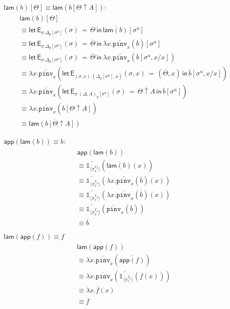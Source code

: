 \documentclass[10pt]{article}
\theoremstyle{definition}
\newcommand{\rewrite}[2]{\overleftarrow{#1}(#2)}
\newcommand\UE[2]{\ensuremath{#1(#2)}}
\newcommand\UI[2]{\ensuremath{\lambda #1.#2}}
\newcommand\EEs[4]{\ensuremath{\mathsf{let} \, \mathsf{E}_{#1}(#3) \, = \, {#2} \, \mathsf{in} \, #4}}
\newcommand\unp[2]{\ensuremath{{#2}^u}}
\newcommand{\modeof}[1]{{#1}_p}
\newcommand{\upstairs}[1]{\overline{#1}}
\newcommand\One{\ensuremath{\mathds{1}}}
\newcommand\ApOne[1]{\ensuremath{\One_{\langle {#1} \rangle }}}
\newcommand\pinv[1]{\ensuremath{\mathtt{pinv}_{#1}}}
\newcommand\qapp[1]{\ensuremath{\mathsf{app}({#1})}}
\newcommand\qlam[1]{\ensuremath{\mathsf{lam}({#1})}}
\begin{document}
\begin{enumerate}[style = multiline, labelwidth = 80pt]
\item[{$\qlam{b}[\Theta] \equiv \qlam{b[\Theta \uparrow A]}$}:]
\begin{align*}
&\upstairs{\qlam{b}[\Theta]} \\
&\equiv \EEs{\sigma.\modeof{\Delta}[\unp{\Delta}{\sigma}]}{\upstairs{\Theta}}{\sigma}{\upstairs{\qlam{b}}[\unp{\Delta}{\sigma}]} \\
&\equiv \EEs{\sigma.\modeof{\Delta}[\unp{\Delta}{\sigma}]}{\upstairs{\Theta}}{\sigma}{\UI{x}{\rewrite{\pinv{x}}{\upstairs{b}}}[\unp{\Delta}{\sigma}]} \\
&\equiv \EEs{\sigma.\modeof{\Delta}[\unp{\Delta}{\sigma}]}{\upstairs{\Theta}}{\sigma}{\UI{x}{\rewrite{\pinv{x}}{\upstairs{b}[\unp{\Delta}{\sigma}, x/x]}}} \\
&\equiv \UI{x}{\rewrite{\pinv{x}}{\EEs{(\sigma, x). (\modeof{\Delta}[\unp{\Delta}{\sigma}], x)}{(\upstairs{\Theta}, x)}{\sigma, x}{\upstairs{b}[\unp{\Delta}{\sigma}, x/x]}}} \\
&\equiv \UI{x}{\rewrite{\pinv{x}}{\EEs{\sigma.\modeof{(\Delta,A)}[\unp{\Delta,A}{\sigma}]}{\upstairs{\Theta \uparrow A}}{\sigma}{\upstairs{b}[\unp{\Delta,A}{\sigma}]}}} \\
&\equiv \UI{x}{\rewrite{\pinv{x}}{\upstairs{b[\Theta \uparrow A]}}} \\
&\equiv \upstairs{\qlam{b[\Theta \uparrow A]}}
\end{align*}

\item[{$\qapp{\qlam{b}} \equiv b$}:] 
\begin{align*}
&\upstairs{\qapp{\qlam{b}}} \\
&\equiv \rewrite{\ApOne{\pi^{\modeof{\Gamma}}_x}}{\UE{\upstairs{\qlam{b}}}{x}} \\
&\equiv \rewrite{\ApOne{\pi^{\modeof{\Gamma}}_x}}{\UE{\UI{x}{\rewrite{\pinv{x}}{\upstairs{b}}}}{x}} \\
&\equiv \rewrite{\ApOne{\pi^{\modeof{\Gamma}}_x}}{\UE{\UI{x}{\rewrite{\pinv{x}}{\upstairs{b}}}}{x}} \\
&\equiv \rewrite{\ApOne{\pi^{\modeof{\Gamma}}_x}}{\rewrite{\pinv{x}}{\upstairs{b}}} \\
&\equiv \upstairs{b}
\end{align*}

\item[{$\qlam{\qapp{f}} \equiv f$}]
\begin{align*}
&\upstairs{\qlam{\qapp{f}}} \\
&\equiv \UI{x}{\rewrite{\pinv{x}}{\upstairs{\qapp{f}}}} \\
&\equiv \UI{x}{\rewrite{\pinv{x}}{\rewrite{\ApOne{\pi^{\modeof{\Gamma}}_x}}{\UE{\upstairs{f}}{x}}}} \\
&\equiv \UI{x}{\UE{\upstairs{f}}{x}} \\
&\equiv \upstairs{f}
\end{align*}
\end{enumerate}
\end{document}
